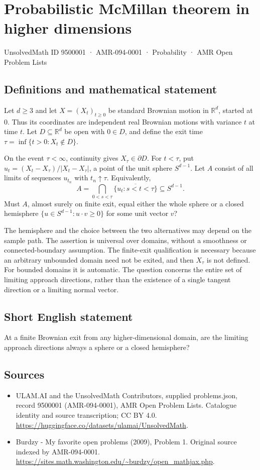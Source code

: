 \documentclass[11pt,a4paper]{article}
\begin{document}
\section*{Probabilistic McMillan theorem in higher dimensions}\label{9500001}
{\small UnsolvedMath ID 9500001 · AMR-094-0001 · Probability · AMR Open Problem Lists}
\subsection{Definitions and mathematical statement}
Let $d\ge3$ and let $X=(X_t)_{t\ge0}$ be standard Brownian motion in $\mathbb R^d$, started at $0$. Thus its coordinates are independent real Brownian motions with variance $t$ at time $t$. Let $D\subseteq\mathbb R^d$ be open with $0\in D$, and define the exit time $\tau=\inf\{t>0:X_t\notin D\}$.

On the event $\tau<\infty$, continuity gives $X_\tau\in\partial D$. For $t<\tau$, put $u_t=(X_t-X_\tau)/|X_t-X_\tau|$, a point of the unit sphere $S^{d-1}$. Let $A$ consist of all limits of sequences $u_{t_n}$ with $t_n\uparrow\tau$. Equivalently,
\[
A=\bigcap_{0<s<\tau}\overline{\{u_t:s<t<\tau\}}\subseteq S^{d-1}.
\]
Must $A$, almost surely on finite exit, equal either the whole sphere or a closed hemisphere $\{u\in S^{d-1}:u\cdot v\ge0\}$ for some unit vector $v$?

The hemisphere and the choice between the two alternatives may depend on the sample path. The assertion is universal over domains, without a smoothness or connected-boundary assumption. The finite-exit qualification is necessary because an arbitrary unbounded domain need not be exited, and then $X_\tau$ is not defined. For bounded domains it is automatic. The question concerns the entire set of limiting approach directions, rather than the existence of a single tangent direction or a limiting normal vector.
\subsection{Short English statement}
At a finite Brownian exit from any higher-dimensional domain, are the limiting approach directions always a sphere or a closed hemisphere?
\subsection{Sources}
\begin{itemize}
\item[S1] ULAM.AI and the UnsolvedMath Contributors, supplied problems.json, record 9500001 (AMR-094-0001), AMR Open Problem Lists. Catalogue identity and source transcription; CC BY 4.0.
\url{https://huggingface.co/datasets/ulamai/UnsolvedMath}.
\item[S2] Burdzy - My favorite open problems (2009), Problem 1. Original source indexed by AMR-094-0001.
\url{https://sites.math.washington.edu/~burdzy/open_mathjax.php}.
\end{itemize}
\end{document}
